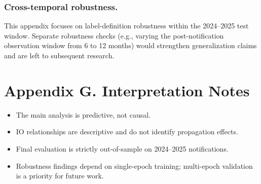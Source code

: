 \documentclass[11pt,a4paper]{article}
\begin{document}
\subsubsection*{Cross-temporal robustness.}
This appendix focuses on label-definition robustness within the 2024--2025 test window. Separate robustness checks (e.g., varying the post-notification observation window from 6 to 12 months) would strengthen generalization claims and are left to subsequent research.

\section*{Appendix G. Interpretation Notes}
\begin{itemize}
  \item The main analysis is predictive, not causal.
  \item IO relationships are descriptive and do not identify propagation effects.
  \item Final evaluation is strictly out-of-sample on 2024--2025 notifications.
  \item Robustness findings depend on single-epoch training; multi-epoch validation is a priority for future work.
\end{itemize}
\end{document}
